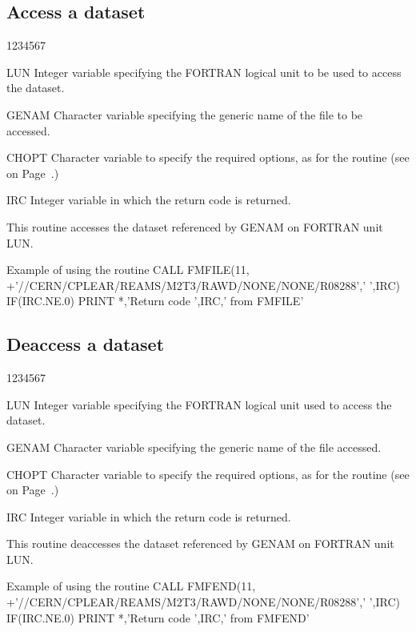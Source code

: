 \subsection{Access a dataset}
\begin{DLtt}{1234567}
\item [LUN]Integer variable specifying the FORTRAN logical unit to be used
to access the dataset.
\item [GENAM]Character variable specifying the generic name of the file to be
accessed.
\item [CHOPT]Character variable to specify the required options, as for
the routine  (see on Page~\pageref{FMOPEN}.)
\item[IRC]Integer variable in which the return code is returned.
\end{DLtt}
\par
This routine accesses the dataset referenced by GENAM on
FORTRAN unit LUN.
\begin{XMPt}{Example of using the \protect{} routine}
      CALL FMFILE(11,
     +'//CERN/CPLEAR/REAMS/M2T3/RAWD/NONE/NONE/R08288',' ',IRC)
      IF(IRC.NE.0) PRINT *,'Return code ',IRC,' from FMFILE'
\end{XMPt}
 
\subsection{Deaccess a dataset}
\begin{DLtt}{1234567}
\item[LUN]Integer variable specifying the FORTRAN logical unit used
to access the dataset.
\item [GENAM]
Character variable specifying the generic name of the file
accessed.
\item [CHOPT]
Character variable to specify the required options, as for
the routine  (see on Page~\pageref{FMCLOS}.)
\item[IRC]Integer variable in which the return code is returned.
\end{DLtt}
\par
This routine deaccesses the dataset referenced by GENAM on
FORTRAN unit LUN.
\begin{XMPt}{Example of using the \protect{} routine}
      CALL FMFEND(11,
     +'//CERN/CPLEAR/REAMS/M2T3/RAWD/NONE/NONE/R08288',' ',IRC)
      IF(IRC.NE.0) PRINT *,'Return code ',IRC,' from FMFEND'
\end{XMPt}
